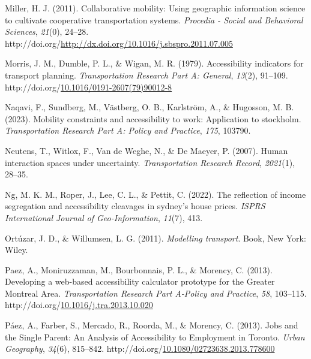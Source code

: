 \documentclass[
11pt, %
oneside, %
english, %
singlespacing, %
]{macthesis} %
\newlength{\cslhangindent}
\newenvironment{CSLReferences}[2] %
{\begin{list}{}{%
	\setlength{\itemindent}{0pt}
	\setlength{\leftmargin}{0pt}
	\setlength{\parsep}{0pt}
	\ifodd #1
	\setlength{\leftmargin}{\cslhangindent}
	\setlength{\itemindent}{-1\cslhangindent}
	\fi
	\setlength{\itemsep}{#2\baselineskip}}}
{\end{list}}
\begin{document}
\begin{CSLReferences}{1}{0}
Miller, H. J. (2011). Collaborative mobility: Using geographic information science to cultivate cooperative transportation systems. \emph{Procedia - Social and Behavioral Sciences}, \emph{21}(0), 24--28. http://doi.org/\url{http://dx.doi.org/10.1016/j.sbspro.2011.07.005}

Morris, J. M., Dumble, P. L., \& Wigan, M. R. (1979). Accessibility indicators for transport planning. \emph{Transportation Research Part A: General}, \emph{13}(2), 91--109. http://doi.org/\href{https://doi.org/10.1016/0191-2607(79)90012-8}{10.1016/0191-2607(79)90012-8}

Naqavi, F., Sundberg, M., Västberg, O. B., Karlström, A., \& Hugosson, M. B. (2023). Mobility constraints and accessibility to work: Application to stockholm. \emph{Transportation Research Part A: Policy and Practice}, \emph{175}, 103790.

Neutens, T., Witlox, F., Van de Weghe, N., \& De Maeyer, P. (2007). Human interaction spaces under uncertainty. \emph{Transportation Research Record}, \emph{2021}(1), 28--35.

Ng, M. K. M., Roper, J., Lee, C. L., \& Pettit, C. (2022). The reflection of income segregation and accessibility cleavages in sydney's house prices. \emph{ISPRS International Journal of Geo-Information}, \emph{11}(7), 413.

Ortúzar, J. D., \& Willumsen, L. G. (2011). \emph{Modelling transport}. Book, New York: Wiley.

Paez, A., Moniruzzaman, M., Bourbonnais, P. L., \& Morency, C. (2013). Developing a web-based accessibility calculator prototype for the {Greater} {Montreal} {Area}. \emph{Transportation Research Part A-Policy and Practice}, \emph{58}, 103--115. http://doi.org/\href{https://doi.org/10.1016/j.tra.2013.10.020}{10.1016/j.tra.2013.10.020}

Páez, A., Farber, S., Mercado, R., Roorda, M., \& Morency, C. (2013). Jobs and the {Single} {Parent}: {An} {Analysis} of {Accessibility} to {Employment} in {Toronto}. \emph{Urban Geography}, \emph{34}(6), 815--842. http://doi.org/\href{https://doi.org/10.1080/02723638.2013.778600}{10.1080/02723638.2013.778600}


\end{CSLReferences}
\end{document}
